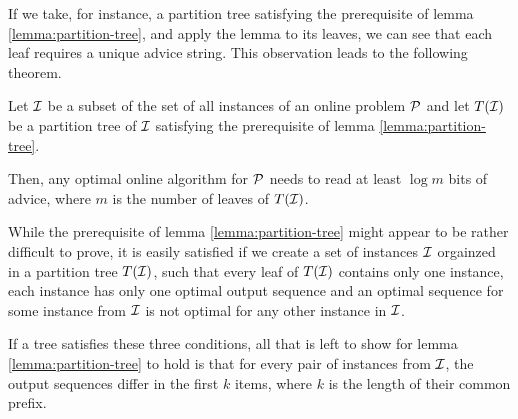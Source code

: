 If we take, for instance, a partition tree satisfying the prerequisite of
lemma \ref{lemma:partition-tree}, and apply the lemma to its leaves, we
can see that each leaf requires a unique advice string. This observation
leads to the following theorem.

\begin{theorem}\label{theorem:partition-tree}
    Let $\mathcal{I}$ be a subset of the set of all instances of an online problem
    $\mathcal{P}$ and let $T(\mathcal{I})$ be a partition tree of $\mathcal{I}$
    satisfying the prerequisite of lemma \ref{lemma:partition-tree}.

    Then, any optimal online algorithm for $\mathcal{P}$ needs to read
    at least $\log{}m$ bits of advice, where $m$ is the number of leaves
    of $T(\mathcal{I})$.
\end{theorem}

While the prerequisite of lemma \ref{lemma:partition-tree} might appear to
be rather difficult to prove, it is easily satisfied if we create a set of
instances $\mathcal{I}$ orgainzed in a partition tree $T(\mathcal{I})$, such that every leaf
of $T(\mathcal{I})$ contains only one instance, each instance has only one optimal
output sequence and an optimal sequence for some instance from $\mathcal{I}$ is not
optimal for any other instance in $\mathcal{I}$.

If a tree satisfies these three conditions, all that is left to show for
lemma \ref{lemma:partition-tree} to hold is that for every pair of
instances from $\mathcal{I}$, the output sequences differ in the first $k$ items,
where $k$ is the length of their common prefix.
